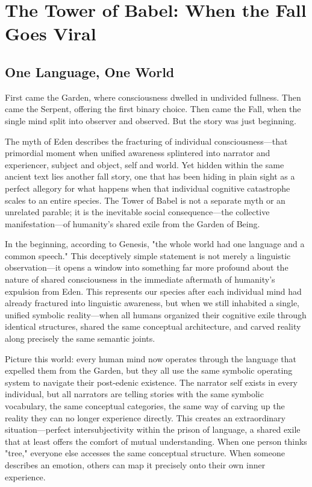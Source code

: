 \chapter{The Tower of Babel: When the Fall Goes Viral}

\section{One Language, One World}

First came the Garden, where consciousness dwelled in undivided fullness.
Then came the Serpent, offering the first binary choice.
Then came the Fall, when the single mind split into observer and observed.
But the story was just beginning.

The myth of Eden describes the fracturing of individual consciousness—that primordial moment when unified awareness splintered into narrator and experiencer, subject and object, self and world. Yet hidden within the same ancient text lies another fall story, one that has been hiding in plain sight as a perfect allegory for what happens when that individual cognitive catastrophe scales to an entire species. The Tower of Babel is not a separate myth or an unrelated parable; it is the inevitable social consequence—the collective manifestation—of humanity's shared exile from the Garden of Being.

In the beginning, according to Genesis, "the whole world had one language and a common speech." This deceptively simple statement is not merely a linguistic observation—it opens a window into something far more profound about the nature of shared consciousness in the immediate aftermath of humanity's expulsion from Eden. This represents our species after each individual mind had already fractured into linguistic awareness, but when we still inhabited a single, unified symbolic reality—when all humans organized their cognitive exile through identical structures, shared the same conceptual architecture, and carved reality along precisely the same semantic joints.

Picture this world: every human mind now operates through the language that expelled them from the Garden, but they all use the same symbolic operating system to navigate their post-edenic existence. The narrator self exists in every individual, but all narrators are telling stories with the same symbolic vocabulary, the same conceptual categories, the same way of carving up the reality they can no longer experience directly. This creates an extraordinary situation—perfect intersubjectivity within the prison of language, a shared exile that at least offers the comfort of mutual understanding. When one person thinks "tree," everyone else accesses the same conceptual structure. When someone describes an emotion, others can map it precisely onto their own inner experience.

